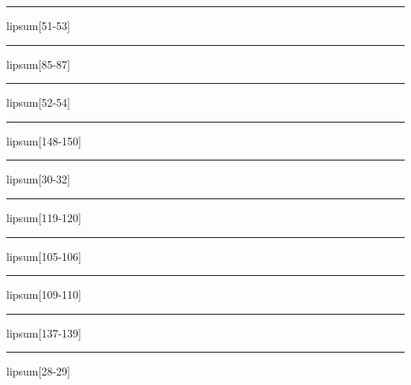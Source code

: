 \documentclass[11pt,a4paper]{article}
\begin{document}
\begin{simplewrap}
  \textcolor{green!33}{\rule{3.8cm}{4.0cm}}
\end{simplewrap}
lipsum[51-53]

\begin{simplewrap}
  \textcolor{purple!29}{\rule{3.0cm}{5.2cm}}
\end{simplewrap}
lipsum[85-87]

\begin{simplewrap}
  \textcolor{olive!51}{\rule{5.9cm}{3.1cm}}
\end{simplewrap}
lipsum[52-54]

\begin{simplewrap}
  \textcolor{cyan!35}{\rule{5.9cm}{4.3cm}}
\end{simplewrap}
lipsum[148-150]

\begin{simplewrap}
  \textcolor{brown!34}{\rule{3.8cm}{8.3cm}}
\end{simplewrap}
lipsum[30-32]

\begin{simplewrap}
  \textcolor{yellow!47}{\rule{6.0cm}{3.4cm}}
\end{simplewrap}
lipsum[119-120]

\begin{simplewrap}
  \textcolor{yellow!38}{\rule{5.4cm}{8.7cm}}
\end{simplewrap}
lipsum[105-106]

\begin{simplewrap}
  \textcolor{purple!50}{\rule{3.9cm}{4.0cm}}
\end{simplewrap}
lipsum[109-110]

\begin{simplewrap}
  \textcolor{green!38}{\rule{6.0cm}{5.8cm}}
\end{simplewrap}
lipsum[137-139]

\begin{simplewrap}
  \textcolor{olive!44}{\rule{3.1cm}{9.7cm}}
\end{simplewrap}
lipsum[28-29]
\end{document}
